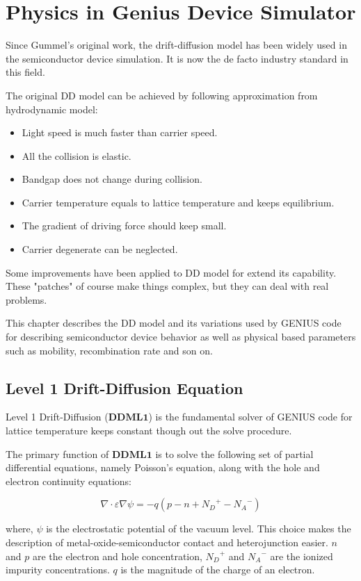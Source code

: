\chapter{Physics in Genius Device Simulator}

Since Gummel's original work, the drift-diffusion model has been widely used in the semiconductor device simulation. It is now the de facto industry standard in this field.

The original DD model can be achieved by following approximation from hydrodynamic model:
\begin{itemize}
\item Light speed is much faster than carrier speed.
\item All the collision is elastic.
\item Bandgap does not change during collision.
\item Carrier temperature equals to lattice temperature and keeps equilibrium.
\item The gradient of driving force should keep small.
\item Carrier degenerate can be neglected.
\end{itemize}

Some improvements have been applied to DD model for extend its capability. These "patches" of course make things complex, but they can deal with real problems.

This chapter describes the DD model and its variations used by GENIUS code for describing semiconductor device behavior as well as physical based parameters such as mobility, recombination rate and son on.

\section{Level 1 Drift-Diffusion Equation}
\label{sec:Equation:DDML1}
Level 1 Drift-Diffusion ($\mathbf{DDML1}$) is the fundamental solver of GENIUS code for lattice temperature keeps constant though out the solve procedure.

The primary function of $\mathbf{DDML1}$ is to solve the following set of partial differential equations, namely Poisson's equation, along with the hole and electron continuity equations:

\begin{equation}
\nabla \cdot \varepsilon \nabla \psi = - q\left( p - n + {N_D}^+ - {N_A}^- \right)
\end{equation}
\par
\par
{}where, $\psi$ is the electrostatic potential of the vacuum level. This choice makes the description of metal-oxide-semiconductor contact and heterojunction easier. $n$ and $p$ are the electron and hole concentration, ${N_D}^{+}$ and ${N_A}^{-}$ are the ionized impurity concentrations. $q$ is the magnitude of the charge of an electron.

